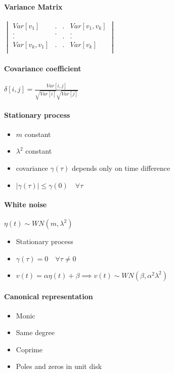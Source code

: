\documentclass{article}
\begin{document}
\paragraph{Variance Matrix}
$\begin{vmatrix}
	Var[v_1]			&	.	&	.	&	Var[v_1,v_k]		\\
		.			&	.	&		&		.			\\
		.			&		&	.	&		.			\\
	Var[v_k,v_1]		&	.	&	.	&	Var[v_k]			\\
				
\end{vmatrix}$
\paragraph{Covariance coefficient}
	$\delta[i,j]=\frac{Var[i,j]}{\sqrt{Var[i]}\sqrt{Var[j]}}$
\paragraph{Stationary process}
\begin{itemize}
	\item $m$ constant
	\item $\lambda^2$ constant
	\item covariance $\gamma(\tau)$ depends only on time difference
	\item $|\gamma(\tau)|\leq\gamma(0)		\quad\forall\tau$
\end{itemize}
\paragraph{White noise} $\eta(t)\sim WN(m,\lambda^2)$
\begin{itemize}
	\item Stationary process
	\item $\gamma(\tau)=0	\quad\forall\tau\neq0$
	\item $v(t)=\alpha \eta (t)+\beta\implies v(t)\sim WN(\beta,\alpha^2 \lambda^2)$
\end{itemize}
\paragraph{Canonical representation}
\begin{itemize}
\item Monic
\item Same degree
\item Coprime
\item Poles and zeros in unit disk
\end{itemize}
\end{document}
